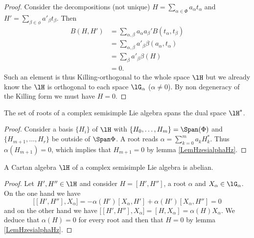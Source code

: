 \begin{proof}
    Consider the decompositions (not unique) \( H=\sum_{\alpha\in\Phi}a_{\alpha} t_{\alpha}\) and \( H'=\sum_{\beta\in\phi}a'_{\beta}t_{\beta}\). Then 
    \begin{subequations}
        \begin{align}
            B(H,H')&=\sum_{\alpha,\beta}a_{\alpha}a_{\beta}'B(t_{\alpha},t_{\beta})\\
            &=\sum_{\alpha,\beta}a'_{\beta}\beta(a_{\alpha},t_{\alpha})\\
            &=\sum_{\beta}a'_{\beta}\beta(H)\\
            &=0.
        \end{align}
    \end{subequations}
    Such an element is thus Killing-orthogonal to the whole space \( \lH\) but we already know the \( \lH\) is orthogonal to each space \( \lG_{\alpha}\) (\( \alpha\neq 0\)). By non degeneracy of the Killing form we must have \( H=0\).
\end{proof}

\begin{proposition}
    The set of roots of a complex semisimple Lie algebra spans the dual space \( \lH^*\).
\end{proposition}

\begin{proof}
    Consider a basis \( \{ H_i \}\) of \( \lH\) with \( \{ H_0,\ldots,H_m \}=\Span(\Phi)\) and \( \{ H_{m+1},\ldots,H_r \}\) be outside of \( \Span\Phi\). A root reads \( \alpha=\sum_{k=0}^ma_kH_k^*\).
    Thus \( \alpha(H_{m+1})=0\), which implies that \( H_{m+1}=0\) by lemma \ref{LemHzesialphaHz}.
\end{proof}

\begin{corollary}
    A Cartan algebra \( \lH\) of a complex semisimple Lie algebra is abelian.
\end{corollary}

\begin{proof}
    Let \( H',H''\in\lH\) and consider \( H=[H',H'']\), a root \( \alpha\) and \( X_{\alpha}\in\lG_{\alpha}\). On the one hand we have
    \begin{equation}
        \big[ [H',H''],X_{\alpha} \big]=-\alpha(H')[X_{\alpha},H']+\alpha(H')[X_{\alpha},H'']=0
    \end{equation}
    and on the other hand we have \( \big[ [H',H''],X_{\alpha} \big]=[H,X_{\alpha}]=\alpha(H)X_{\alpha}\). We deduce that \( \alpha(H)=0\) for every root and then that \( H=0\) by lemma \ref{LemHzesialphaHz}.
\end{proof}

